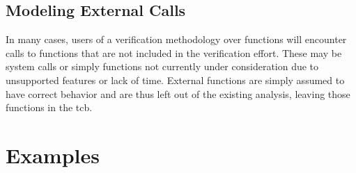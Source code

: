 \subsection{Modeling External Calls}
In many cases, users of a verification methodology over functions
will encounter calls to functions that are not included in the verification effort.
These may be system calls or simply functions not currently under consideration
due to unsupported features or lack of time.
External functions are simply assumed to have correct behavior
and are thus left out of the existing analysis,
leaving those functions in the \ac{tcb}.


\section{Examples}\label{se:cfg_examples}
